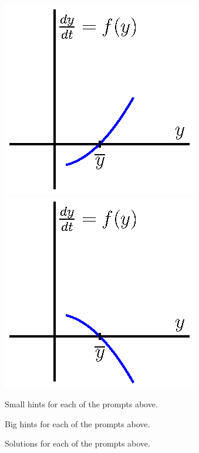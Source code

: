 \begin{activity}
  \begin{center}
    \includegraphics{figures/7_2_Act2_3.eps} \qquad
    \includegraphics{figures/7_2_Act2_4.eps} 
  \end{center}

\ea
\end{activity}
\begin{smallhint}
\ba
	\item Small hints for each of the prompts above.
\ea
\end{smallhint}
\begin{bighint}
\ba
	\item Big hints for each of the prompts above.
\ea
\end{bighint}
\begin{activitySolution}
\ba
	\item Solutions for each of the prompts above.
\ea
\end{activitySolution}
\aftera
